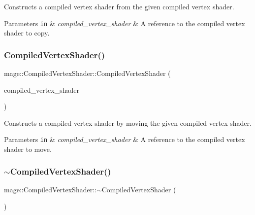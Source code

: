 Constructs a compiled vertex shader from the given compiled vertex shader.


\begin{DoxyParams}[1]{Parameters}
\mbox{\tt in}  & {\em compiled\+\_\+vertex\+\_\+shader} & A reference to the compiled vertex shader to copy. \\
\hline
\end{DoxyParams}
\hypertarget{structmage_1_1_compiled_vertex_shader_a97c8c7d797a9fffd6005562ecf732fb8}{}\label{structmage_1_1_compiled_vertex_shader_a97c8c7d797a9fffd6005562ecf732fb8} 
\subsubsection{\texorpdfstring{Compiled\+Vertex\+Shader()}{CompiledVertexShader()}\hspace{0.1cm}{\footnotesize\ttfamily [4/4]}}
{\footnotesize\ttfamily mage\+::\+Compiled\+Vertex\+Shader\+::\+Compiled\+Vertex\+Shader (\begin{DoxyParamCaption}\item[{\hyperlink{structmage_1_1_compiled_vertex_shader}{Compiled\+Vertex\+Shader} \&\&}]{compiled\+\_\+vertex\+\_\+shader }\end{DoxyParamCaption})\hspace{0.3cm}{\ttfamily [default]}}

Constructs a compiled vertex shader by moving the given compiled vertex shader.


\begin{DoxyParams}[1]{Parameters}
\mbox{\tt in}  & {\em compiled\+\_\+vertex\+\_\+shader} & A reference to the compiled vertex shader to move. \\
\hline
\end{DoxyParams}
\hypertarget{structmage_1_1_compiled_vertex_shader_a556e30c4386f3ef83571bbe8eb366d19}{}\label{structmage_1_1_compiled_vertex_shader_a556e30c4386f3ef83571bbe8eb366d19} 
\subsubsection{\texorpdfstring{$\sim$\+Compiled\+Vertex\+Shader()}{~CompiledVertexShader()}}
{\footnotesize\ttfamily mage\+::\+Compiled\+Vertex\+Shader\+::$\sim$\+Compiled\+Vertex\+Shader (\begin{DoxyParamCaption}{ }\end{DoxyParamCaption})\hspace{0.3cm}{\ttfamily [default]}}

